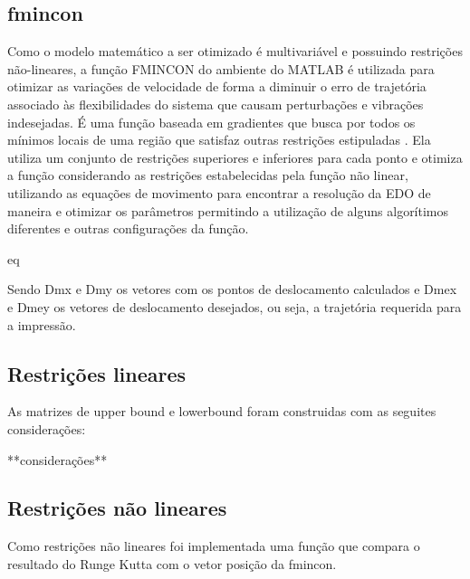 \subsection{fmincon}

Como o modelo matemático a ser otimizado é multivariável e 
possuindo restrições não-lineares, a função FMINCON do ambiente 
do MATLAB é utilizada para otimizar as variações de velocidade 
de forma a diminuir o erro de trajetória associado às 
flexibilidades do sistema que causam perturbações e vibrações 
indesejadas.
É uma função baseada em gradientes que busca por todos os 
mínimos locais de uma região que satisfaz outras restrições 
estipuladas \cite{albaghdadi21}.
Ela utiliza um conjunto de restrições superiores e inferiores 
para cada ponto e otimiza a função considerando as restrições 
estabelecidas pela função não linear, utilizando as equações de 
movimento para encontrar a resolução da EDO de maneira e 
otimizar os parâmetros permitindo a utilização de alguns algorítimos
diferentes e outras configurações da função.


eq

Sendo Dmx e Dmy os vetores com os pontos de deslocamento 
calculados e Dmex e Dmey os vetores de deslocamento desejados, 
ou seja, a trajetória requerida para a impressão.

\subsection{Restrições lineares}
As matrizes de upper bound e lowerbound foram construidas com as seguites considerações:





**considerações**

\subsection{Restrições não lineares}
Como restrições não lineares foi implementada uma função que compara
o resultado do Runge Kutta com o vetor posição da fmincon.




